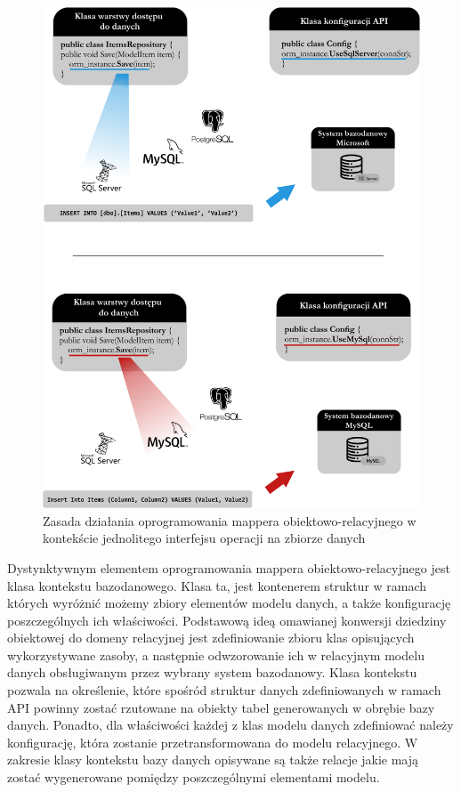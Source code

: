 \begin{figure}[ht]
 \centering
  \includegraphics[width=1\linewidth]{rys02/orm-wyjasnienie}
 \caption{Zasada działania oprogramowania mappera obiektowo-relacyjnego w kontekście jednolitego interfejsu operacji na zbiorze danych}
 \label{fig:orm-wyjasnienie}
\end{figure}

Dystynktywnym elementem oprogramowania mappera obiektowo-relacyjnego jest klasa kontekstu bazodanowego. Klasa ta, jest kontenerem struktur w ramach których wyróżnić możemy zbiory elementów modelu danych, a także konfigurację poszczególnych ich właściwości. Podstawową ideą omawianej konwersji dziedziny obiektowej do domeny relacyjnej jest zdefiniowanie zbioru klas opisujących wykorzystywane zasoby, a następnie odwzorowanie ich w relacyjnym modelu danych obsługiwanym przez wybrany system bazodanowy. Klasa kontekstu pozwala na określenie, które spośród struktur danych zdefiniowanych w ramach API powinny zostać rzutowane na obiekty tabel generowanych w obrębie bazy danych. Ponadto, dla właściwości każdej z klas modelu danych zdefiniować należy konfigurację, która zostanie przetransformowana do modelu relacyjnego. W zakresie klasy kontekstu bazy danych opisywane są także relacje jakie mają zostać wygenerowane pomiędzy poszczególnymi elementami modelu.

